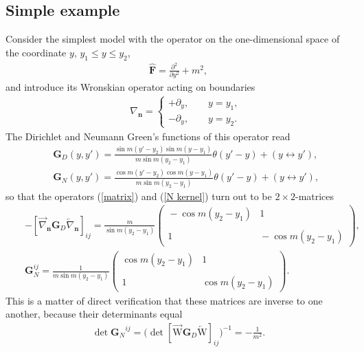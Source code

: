 \documentclass[a4paper,12pt]{article}
\newcommand{\un}{\mathbf n} %
\newcommand{\ddy}{{\partial_y}}
\newcommand{\BBox}{\hat{\mathbf{F}}}  %
\newcommand{\Bnabla}{\nabla}  %
\newcommand{\Bnablan}{\nabla_{\un}}
\newcommand{\GrN}{ \mathbf{G}_{N}}  %
\newcommand{\GrD}{ \mathbf{G}_{D}}  %
\newcommand{\nGrDn}{\overrightarrow{\mathrm{W}}\mathbf{G}_{D}\overleftarrow{\mathrm{W}}} %
\begin{document}
\subsection{Simple example}
\hspace{\parindent}Consider the simplest model with the operator
on the one-dimensional space of the coordinate $y$, $y_1\leq y\leq
y_2$,
    \begin{eqnarray}
     \BBox=\frac{\partial^2}
     {\partial y^2} + m^2,          \label{1dOperator}
    \end{eqnarray}
and introduce its Wronskian operator acting on boundaries
    \begin{eqnarray}
     &&\Bnablan =
     \left\{\begin{array}{l}
     +\ddy, \qquad y=y_1, \\
     -\ddy, \qquad y=y_2.
     \end{array}\right.
    \end{eqnarray}
The Dirichlet and Neumann Green's functions of this operator read
    \begin{eqnarray}
     &&\GrD(y,y')=
     \frac{\sin{m(y'\!-\!y_2)}\sin{m(y\!-\!y_1)}}
     {m\sin{m(y_2\!-\!y_1)}}\theta(y'\!-\!y)
     +(y\leftrightarrow y'),\\
     &&\GrN(y,y')=
     \frac{\cos{m(y'\!-\!y_2)}\cos{m(y\!-\!y_1)}}
     {m\sin{m(y_2\!-\!y_1)}}\theta(y'\!-\!y)
     +(y\leftrightarrow y'),
    \end{eqnarray}
so that the operators (\ref{matrix}) and (\ref{N kernel}) turn out
to be $2\times2$-matrices
    \begin{eqnarray}
     &&-[\overrightarrow{\Bnabla}_\un
     \GrD\overleftarrow{\Bnabla}_\un]_{ij}=
     \frac{m}{\sin{m(y_2\!-\!y_1)}}
     \left(
     \begin{array}{cc}
      \!\!-\cos{m(y_2\!-\!y_1)}
      &\! 1 \\
      &\!\!\\
      \!\! 1
      &\!\!-\cos{m(y_2\!-\!y_1)}
     \end{array}\!\!\!\right),          \label{1d nGrDn}\\
     &&\GrN^{ij}=
     \frac{1}{m\sin{m(y_2\!-\!y_1)}}
     \left(
     \begin{array}{cc}
      \!\!\cos{m(y_2\!-\!y_1)}
      &\! 1 \\
      &\!\!\\
      \!\! 1
      &\!\!\cos{m(y_2\!-\!y_1)}
     \end{array}\!\!\!\right).          \label{1d GrN}
    \end{eqnarray}
This is a matter of direct verification that these matrices are
inverse to one another, because their determinants equal
    \begin{eqnarray}
     \det{\GrN}^{ij}=\Big(\det[\nGrDn]_{ij}\Big)^{-1}
     =-\frac{1}{m^2}.
    \end{eqnarray}
\end{document}

